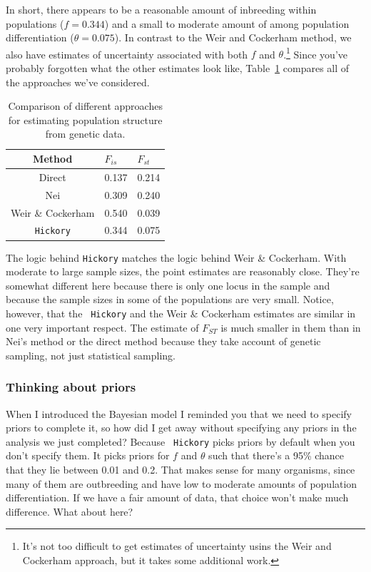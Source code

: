 \documentclass[12pt]{article}
\begin{document}
In short, there appears to be a reasonable amount of inbreeding within
populations ($f = 0.344$) and a small to moderate amount of among
population differentiation ($\theta = 0.075$). In contrast to the Weir
and Cockerham method, we also have estimates of uncertainty associated
with both $f$ and $\theta$.\footnote{It's not too difficult to get
  estimates of uncertainty usins the Weir and Cockerham approach, but
  it takes some additional work.} Since you've probably forgotten what
the other estimates look like, Table~\ref{table:hickory-comparison}
compares all of the approaches we've considered.

\begin{table}
\begin{center}
  \begin{tabular}{c|ll}
\hline\hline
Method & $F_{is}$ & $F_{st}$ \\
\hline
Direct            & 0.137 & 0.214 \\
Nei               & 0.309 & 0.240 \\
Weir \& Cockerham & 0.540 & 0.039 \\
{\tt Hickory}     & 0.344 & 0.075 \\
\hline
\end{tabular}
\end{center}
\caption{Comparison of different approaches for estimating population
  structure from genetic data.}\label{table:hickory-comparison}
\end{table}

The logic behind {\tt Hickory\/} matches the logic behind Weir \&
Cockerham. With moderate to large sample sizes, the point estimates
are reasonably close. They're somewhat different here because there is
only one locus in the sample and because the sample sizes in some of
the populations are very small. Notice, however, that the {\tt
  Hickory} and the Weir \& Cockerham estimates are similar in one very
important respect. The estimate of $F_{ST}$ is much smaller in them
than in Nei's method or the direct method because they take account of
genetic sampling, not just statistical sampling.

\subsubsection*{Thinking about priors}

When I introduced the Bayesian model I reminded you that we need to
specify priors to complete it, so how did I get away without
specifying any priors in the analysis we just completed? Because {\tt
  Hickory} picks priors by default when you don't specify them. It
picks priors for $f$ and $\theta$ such that there's a 95\% chance that
they lie between 0.01 and 0.2. That makes sense for many organisms,
since many of them are outbreeding and have low to moderate amounts of
population differentiation. If we have a fair amount of data, that
choice won't make much difference. What about here?
\end{document}
